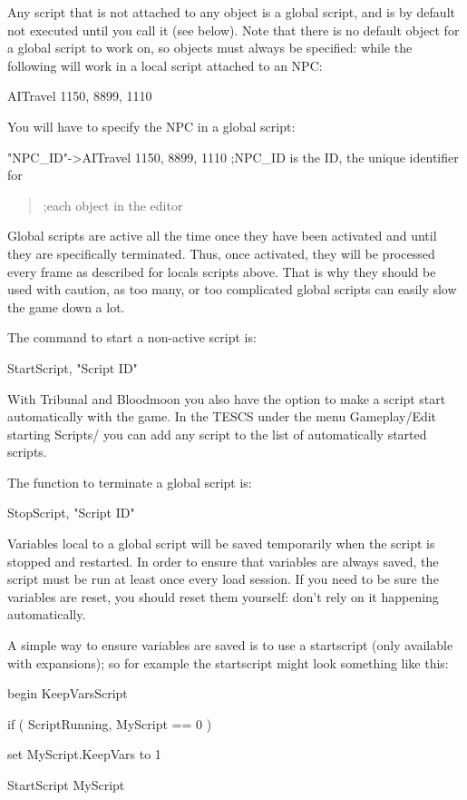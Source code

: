 \documentclass[
]{article}
\begin{document}
Any script that is not attached to any object is a global script, and is
by default not executed until you call it (see below). Note that there
is no default object for a global script to work on, so objects must
always be specified: while the following will work in a local script
attached to an NPC:

AITravel 1150, 8899, 1110

You will have to specify the NPC in a global script:

"NPC\_ID"-\textgreater AITravel 1150, 8899, 1110 ;NPC\_ID is the ID, the
unique identifier for

\begin{quote}
;each object in the editor
\end{quote}

Global scripts are active all the time once they have been activated and
until they are specifically terminated. Thus, once activated, they will
be processed every frame as described for locals scripts above. That is
why they should be used with caution, as too many, or too complicated
global scripts can easily slow the game down a lot.

The command to start a non-active script is:

StartScript, "Script ID"

With Tribunal and Bloodmoon you also have the option to make a script
start automatically with the game. In the TESCS under the menu
Gameplay/Edit starting Scripts/ you can add any script to the list of
automatically started scripts.

The function to terminate a global script is:

StopScript, "Script ID"

Variables local to a global script will be saved temporarily when the
script is stopped and restarted. In order to ensure that variables are
always saved, the script must be run at least once every load session.
If you need to be sure the variables are reset, you should reset them
yourself: don't rely on it happening automatically.

A simple way to ensure variables are saved is to use a startscript (only
available with expansions); so for example the startscript might look
something like this:

begin KeepVarsScript

if ( ScriptRunning, MyScript == 0 )

set MyScript.KeepVars to 1

StartScript MyScript
\end{document}
